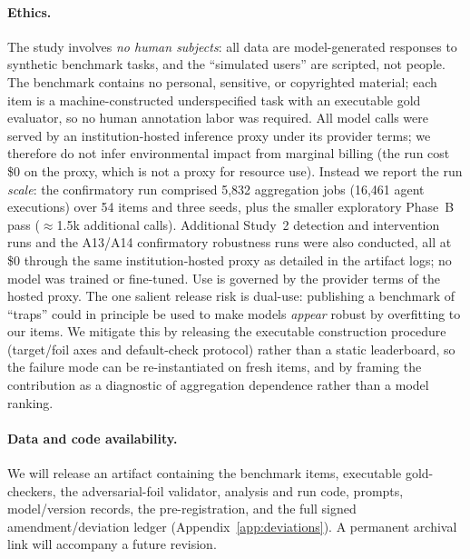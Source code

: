 \documentclass[acmsmall,screen,nonacm]{acmart}
\begin{document}
\paragraph{Ethics.} The study involves \emph{no human subjects}: all data are model-generated responses to
synthetic benchmark tasks, and the ``simulated users'' are scripted, not people. The benchmark contains no
personal, sensitive, or copyrighted material; each item is a machine-constructed underspecified task with an
executable gold evaluator, so no human annotation labor was required. All model calls were served by an
institution-hosted inference proxy under its provider terms; we therefore do not infer environmental impact from
marginal billing (the run cost \$0 on the proxy, which is not a proxy for resource use). Instead we report the
run \emph{scale}: the confirmatory run comprised 5{,}832 aggregation jobs (16{,}461 agent executions) over 54
items and three seeds, plus the smaller exploratory Phase~B pass ($\approx$1.5k additional calls). Additional
Study~2 detection and intervention runs and the A13/A14 confirmatory robustness runs were also conducted, all
at \$0 through the same institution-hosted proxy as detailed in the artifact logs; no model
was trained or fine-tuned. Use is governed by the provider terms of the hosted proxy. The one salient
release risk is dual-use: publishing a benchmark of ``traps'' could in principle be used to make models
\emph{appear} robust by overfitting to our items. We mitigate this by releasing the executable construction
procedure (target/foil axes and default-check protocol) rather than a static leaderboard, so the failure mode
can be re-instantiated on fresh items, and by framing the contribution as a diagnostic of aggregation
dependence rather than a model ranking.
\paragraph{Data and code availability.} We will release an artifact
containing the benchmark items, executable gold-checkers, the adversarial-foil validator, analysis and run
code, prompts, model/version records, the pre-registration, and the full signed amendment/deviation ledger
(Appendix~\ref{app:deviations}). A permanent archival link will accompany a future revision.

\end{document}
